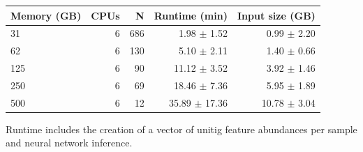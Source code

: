 \centering
\caption{Validation inference computational resources stratified by memory tier (987 samples)}
\label{tab:resources}
\begin{tabular*}{\columnwidth}{@{\extracolsep{\fill}}lrrrr@{\extracolsep{\fill}}}
\toprule
Memory (GB) & CPUs & N & Runtime (min) & Input size (GB) \\
\midrule
31 & 6 & 686 & 1.98 $\pm$ 1.52 & 0.99 $\pm$ 2.20 \\
62 & 6 & 130 & 5.10 $\pm$ 2.11 & 1.40 $\pm$ 0.66 \\
125 & 6 & 90 & 11.12 $\pm$ 3.52 & 3.92 $\pm$ 1.46 \\
250 & 6 & 69 & 18.46 $\pm$ 7.36 & 5.95 $\pm$ 1.89 \\
500 & 6 & 12 & 35.89 $\pm$ 17.36 & 10.78 $\pm$ 3.04 \\
\bottomrule
\end{tabular*}
\par\vspace{4pt}
\parbox{\linewidth}{\footnotesize Runtime includes the creation of a vector of unitig feature abundances per sample and neural network inference.}